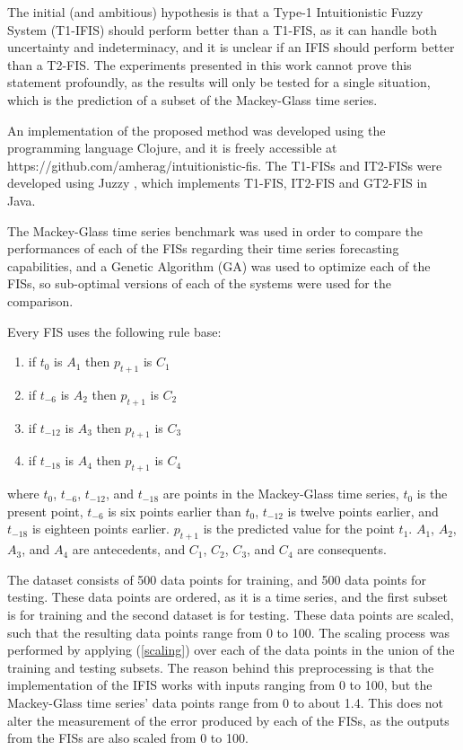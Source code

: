 \documentclass[conference]{IEEEtran}
\begin{document}
The initial (and ambitious) hypothesis is that a Type-1 Intuitionistic Fuzzy System (T1-IFIS)
should perform better than a T1-FIS, as it can handle both uncertainty
and indeterminacy, and it is unclear if an IFIS should perform better
than a T2-FIS. The experiments presented in this work
cannot prove this statement profoundly, as the results will only be tested for a
single situation, which is the prediction of a subset of the
Mackey-Glass time series.

An implementation of the proposed method was developed using the
programming language Clojure, and it is freely accessible at
https://github.com/amherag/intuitionistic-fis. The T1-FISs and
IT2-FISs were developed using Juzzy \cite{wagner2013juzzy}, which
implements T1-FIS, IT2-FIS and GT2-FIS in Java.

The Mackey-Glass time series benchmark was used in order to compare
the performances of each of the FISs regarding their time series
forecasting capabilities, and a Genetic Algorithm (GA) was
used to optimize each of the FISs, so sub-optimal versions of each of
the systems were used for the comparison.

Every FIS uses the following rule base:

\begin{enumerate}
  \item if $t_{0}$ is $A_{1}$ then $p_{t+1}$ is $C_{1}$
  \item if $t_{-6}$ is $A_{2}$ then $p_{t+1}$ is $C_{2}$
  \item if $t_{-12}$ is $A_{3}$ then $p_{t+1}$ is $C_{3}$
  \item if $t_{-18}$ is $A_{4}$ then $p_{t+1}$ is $C_{4}$
\end{enumerate}
where $t_{0}$, $t_{-6}$, $t_{-12}$, and $t_{-18}$ are points in the
Mackey-Glass time series, $t_{0}$ is the present point, $t_{-6}$ is six
points earlier than $t_{0}$, $t_{-12}$ is twelve points earlier, and
$t_{-18}$ is eighteen points earlier. $p_{t+1}$ is the predicted value
for the point $t_{1}$. $A_{1}$, $A_{2}$, $A_{3}$, and $A_{4}$ are
antecedents, and $C_{1}$, $C_{2}$, $C_{3}$, and $C_{4}$ are
consequents.

The dataset consists of 500 data points for training, and 500 data
points for testing. These data points are ordered, as it is a time
series, and the first subset is for training and the second dataset is
for testing. These data points are scaled, such that the
resulting data points range from 0 to 100. The scaling process was
performed by applying (\ref{scaling}) over each of the data points in
the union of the training and testing subsets. The reason behind this
preprocessing is that the implementation of the IFIS works with inputs
ranging from 0 to 100, but the Mackey-Glass time series' data points
range from 0 to about 1.4. This does not alter the measurement of the
error produced by each of the FISs, as the outputs from the FISs are
also scaled from 0 to 100.
\end{document}
